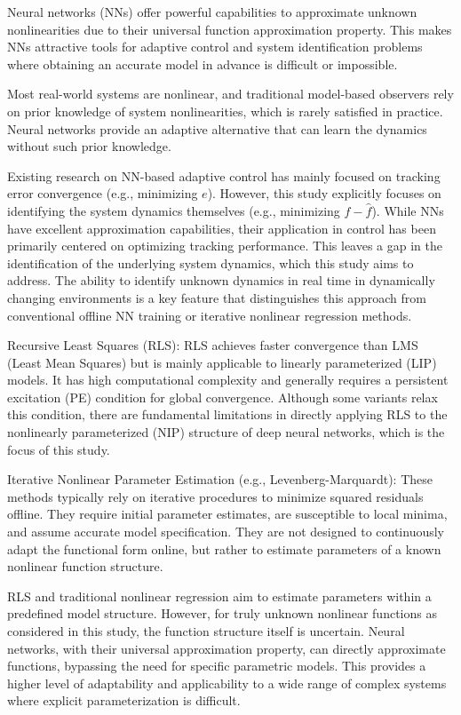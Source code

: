 \documentclass[10pt,twocolumn]{ICCAS}
\begin{document}
Neural networks (NNs) offer powerful capabilities to approximate unknown nonlinearities due to their universal function approximation property. This makes NNs attractive tools for adaptive control and system identification problems where obtaining an accurate model in advance is difficult or impossible.

Most real-world systems are nonlinear, and traditional model-based observers rely on prior knowledge of system nonlinearities, which is rarely satisfied in practice. Neural networks provide an adaptive alternative that can learn the dynamics without such prior knowledge.

Existing research on NN-based adaptive control has mainly focused on tracking error convergence (e.g., minimizing $e$). However, this study explicitly focuses on identifying the system dynamics themselves (e.g., minimizing $f - \hat{f}$). While NNs have excellent approximation capabilities, their application in control has been primarily centered on optimizing tracking performance. This leaves a gap in the identification of the underlying system dynamics, which this study aims to address. The ability to identify unknown dynamics in real time in dynamically changing environments is a key feature that distinguishes this approach from conventional offline NN training or iterative nonlinear regression methods.

Recursive Least Squares (RLS): RLS achieves faster convergence than LMS (Least Mean Squares) but is mainly applicable to linearly parameterized (LIP) models. It has high computational complexity and generally requires a persistent excitation (PE) condition for global convergence. Although some variants relax this condition, there are fundamental limitations in directly applying RLS to the nonlinearly parameterized (NIP) structure of deep neural networks, which is the focus of this study.

Iterative Nonlinear Parameter Estimation (e.g., Levenberg-Marquardt): These methods typically rely on iterative procedures to minimize squared residuals offline. They require initial parameter estimates, are susceptible to local minima, and assume accurate model specification. They are not designed to continuously adapt the functional form online, but rather to estimate parameters of a known nonlinear function structure.

RLS and traditional nonlinear regression aim to estimate parameters within a predefined model structure. However, for truly unknown nonlinear functions as considered in this study, the function structure itself is uncertain. Neural networks, with their universal approximation property, can directly approximate functions, bypassing the need for specific parametric models. This provides a higher level of adaptability and applicability to a wide range of complex systems where explicit parameterization is difficult.
\end{document}
